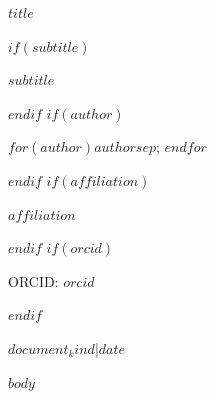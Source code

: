 \documentclass[11pt,a4paper]{article}
\begin{document}
\thispagestyle{plain}
{\raggedright{}\sffamily\bfseries\color{Ink}\fontsize{20}{25}\selectfont $title$\par}
$if(subtitle)$
\vspace{7pt}
{\raggedright\sffamily\color{Muted}\normalsize $subtitle$\par}
$endif$
\vspace{8pt}
$if(author)$
{\sffamily\fontsize{12}{15}\selectfont $for(author)$$author$$sep$; $endfor$\par}
$endif$
$if(affiliation)$
\vspace{4pt}
{\sffamily\small $affiliation$\par}
$endif$
$if(orcid)$
\vspace{3pt}
{\sffamily\footnotesize\color{Muted} ORCID: \href{https://orcid.org/$orcid$}{$orcid$}\par}
$endif$
\vspace{7pt}
{\sffamily\footnotesize\color{Muted} $document_kind$\quad |\quad $date$\par}
\vspace{8pt}
$body$
\end{document}
